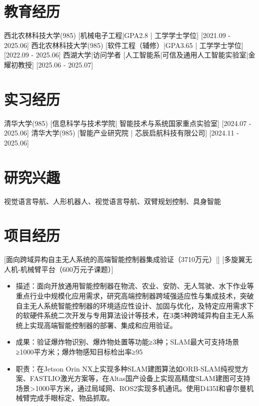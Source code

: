 \documentclass{resume}
\begin{document}



\ResumeTitle

\section{教育经历}
\ResumeItem
{西北农林科技大学(985)}
[\textnormal{机械电子工程|GPA2.8 | 工学学士学位}]
[2021.09 - 2025.06]
\ResumeItem
{西北农林科技大学(985)}
[\textnormal{软件工程（辅修）|GPA3.65 | 工学学士学位}]
[2022.09 - 2025.06]
\ResumeItem
{西湖大学|访问学者}
[\textnormal{人工智能系|可信及通用人工智能实验室|金耀初教授}]
[2025.06 - 2025.07]


\section{实习经历}
\ResumeItem
{清华大学(985)}
[\textnormal{信息科学与技术学院| 智能技术与系统国家重点实验室}]
[2024.07 - 2025.06]
\ResumeItem
{清华大学(985)}
[\textnormal{智能产业研究院 | 芯辰启航科技有限公司}]
[2024.11 - 2025.06]

\section{研究兴趣}
视觉语言导航、人形机器人、视觉语言导航、双臂规划控制、具身智能



\section{项目经历}
[\textnormal{面向跨域异构自主无人系统的高端智能控制器集成验证（3710万元）|}]
[\textnormal{多旋翼无人机-机械臂平台（600万元子课题）}]
\begin{itemize}
    \item 描述：面向开放通用智能控制器在物流、农业、安防、无人驾驶、水下作业等重点行业中规模化应用需求，研究高端控制器跨域强适应性与集成技术，突破自主无人系统智能控制器的环境适应性设计、加固与优化，及特定应用需求下的软硬件系统二次开发与专用算法设计等技术，在3类5种跨域异构自主无人系统上实现高端智能控制器的部署、集成和应用验证。
    \item 成果：验证爆炸物识别、爆炸物处置等功能≥3种；SLAM最大可支持场景≥1000平方米；爆炸物感知目标检出率≥95%
    \item 职责：在Jetson Orin NX上实现多种SLAM建图算法如ORB-SLAM纯视觉方案、FASTLIO激光方案等，在Altas国产设备上实现高精度SLAM建图可支持场景>1000平方米，通过局域网、ROS2实现多机通讯。使用D435I和睿尔曼机械臂完成手眼标定、物品抓取。
\end{itemize}
\end{document}
